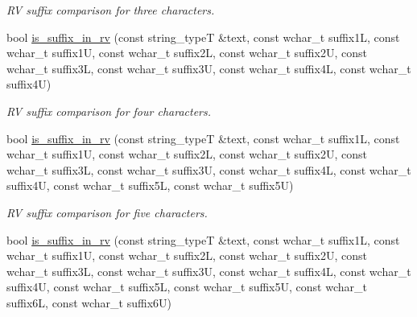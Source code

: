 \begin{DoxyCompactItemize}
\begin{DoxyCompactList}\small\item\em R\-V suffix comparison for three characters. \end{DoxyCompactList}\item 
\hypertarget{group___stemming_gacdaff4e73f7f3841beed04775b5d4f21}{bool \hyperlink{group___stemming_gacdaff4e73f7f3841beed04775b5d4f21}{is\-\_\-suffix\-\_\-in\-\_\-rv} (const string\-\_\-type\-T \&text, const wchar\-\_\-t suffix1\-L, const wchar\-\_\-t suffix1\-U, const wchar\-\_\-t suffix2\-L, const wchar\-\_\-t suffix2\-U, const wchar\-\_\-t suffix3\-L, const wchar\-\_\-t suffix3\-U, const wchar\-\_\-t suffix4\-L, const wchar\-\_\-t suffix4\-U)}\label{group___stemming_gacdaff4e73f7f3841beed04775b5d4f21}

\begin{DoxyCompactList}\small\item\em R\-V suffix comparison for four characters. \end{DoxyCompactList}\item 
\hypertarget{group___stemming_ga99ef9b0e80da18c39cc0206a666bd4b1}{bool \hyperlink{group___stemming_ga99ef9b0e80da18c39cc0206a666bd4b1}{is\-\_\-suffix\-\_\-in\-\_\-rv} (const string\-\_\-type\-T \&text, const wchar\-\_\-t suffix1\-L, const wchar\-\_\-t suffix1\-U, const wchar\-\_\-t suffix2\-L, const wchar\-\_\-t suffix2\-U, const wchar\-\_\-t suffix3\-L, const wchar\-\_\-t suffix3\-U, const wchar\-\_\-t suffix4\-L, const wchar\-\_\-t suffix4\-U, const wchar\-\_\-t suffix5\-L, const wchar\-\_\-t suffix5\-U)}\label{group___stemming_ga99ef9b0e80da18c39cc0206a666bd4b1}

\begin{DoxyCompactList}\small\item\em R\-V suffix comparison for five characters. \end{DoxyCompactList}\item 
\hypertarget{group___stemming_ga527b081fee02f191713a50dbc396f986}{bool \hyperlink{group___stemming_ga527b081fee02f191713a50dbc396f986}{is\-\_\-suffix\-\_\-in\-\_\-rv} (const string\-\_\-type\-T \&text, const wchar\-\_\-t suffix1\-L, const wchar\-\_\-t suffix1\-U, const wchar\-\_\-t suffix2\-L, const wchar\-\_\-t suffix2\-U, const wchar\-\_\-t suffix3\-L, const wchar\-\_\-t suffix3\-U, const wchar\-\_\-t suffix4\-L, const wchar\-\_\-t suffix4\-U, const wchar\-\_\-t suffix5\-L, const wchar\-\_\-t suffix5\-U, const wchar\-\_\-t suffix6\-L, const wchar\-\_\-t suffix6\-U)}\label{group___stemming_ga527b081fee02f191713a50dbc396f986}


\end{DoxyCompactItemize}
